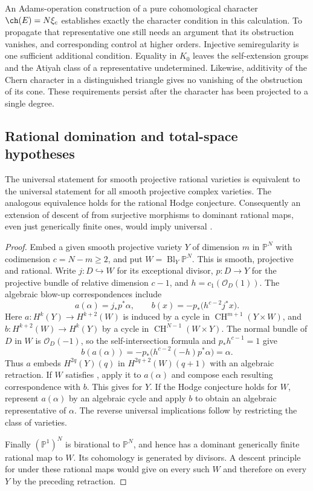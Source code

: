 An Adams-operation construction of a pure cohomological character
$\ch(E)=N\xi_c$ establishes exactly the character condition in this
calculation.  To propagate that representative one still needs an
argument that its obstruction vanishes, and corresponding control at
higher orders.  Injective semiregularity is one sufficient additional
condition.  Equality in $K_0$ leaves the self-extension groups and the
Atiyah class of a representative undetermined.  Likewise, additivity
of the Chern character in a distinguished triangle gives no vanishing
of the obstruction of its cone.  These requirements persist after
the character has been projected to a single degree.

\subsection{Rational domination and total-space hypotheses}

\begin{proposition}\label{v7:rational-varieties}
The universal statement \Fiii{} for smooth projective rational varieties
is equivalent to the universal statement \Fiii{} for all smooth
projective complex varieties.  The analogous equivalence holds for the
rational Hodge conjecture.  Consequently an extension of descent of
\Fiii{} from surjective morphisms to dominant rational maps, even just
generically finite ones, would imply universal \Fiii{}.
\end{proposition}

\begin{proof}
Embed a given smooth projective variety $Y$ of dimension $m$ in
$\mathbb P^N$ with codimension $c=N-m\ge2$, and put
$W=\operatorname{Bl}_Y\mathbb P^N$.  This is smooth, projective and
rational.  Write $j:D\hookrightarrow W$ for its exceptional divisor,
$p:D\to Y$ for the projective bundle of relative dimension $c-1$, and
$h=c_1(\mathcal O_D(1))$.  The algebraic blow-up correspondences
\cite[\S9]{Man68} include
\[
 a(\alpha)=j_*p^*\alpha,\qquad
 b(x)=-p_*\bigl(h^{c-2}j^*x\bigr).
\]
Here $a:H^k(Y)\to H^{k+2}(W)$ is induced by a cycle in
$\operatorname{CH}^{m+1}(Y\times W)$, and
$b:H^{k+2}(W)\to H^k(Y)$ by a cycle in
$\operatorname{CH}^{N-1}(W\times Y)$.
The normal bundle of $D$ in $W$ is $\mathcal O_D(-1)$, so the
self-intersection formula and $p_*h^{c-1}=1$ give
\[
 b(a(\alpha))
   =-p_*\bigl(h^{c-2}(-h)p^*\alpha\bigr)=\alpha.
\]
Thus $a$ embeds $H^{2q}(Y)(q)$ in $H^{2q+2}(W)(q+1)$ with an
algebraic retraction.  If $W$ satisfies \Fiii{}, apply it to $a(\alpha)$
and compose each resulting correspondence with $b$.  This gives
\Fiii{} for $Y$.  If the Hodge conjecture holds for $W$, represent
$a(\alpha)$ by an algebraic cycle and apply $b$ to obtain an algebraic
representative of $\alpha$.  The reverse universal implications follow
by restricting the class of varieties.

Finally $(\mathbb P^1)^N$ is birational to $\mathbb P^N$, and hence has a
dominant generically finite rational map to $W$.  Its cohomology is
generated by divisors.  A descent principle for \Fiii{} under these
rational maps would give \Fiii{} on every such $W$ and therefore on
every $Y$ by the preceding retraction.
\end{proof}

